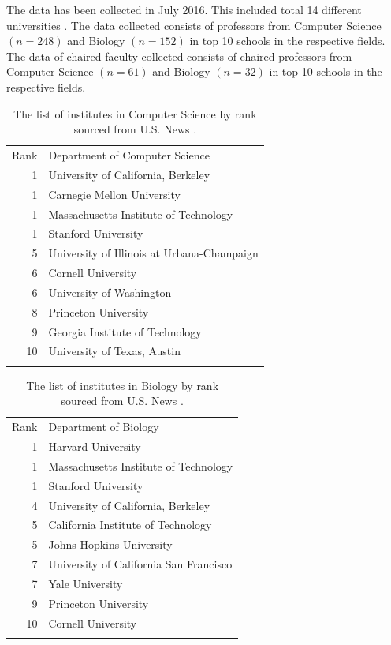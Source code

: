 The data has been collected in July 2016. This included total 14 different universities . The data collected consists of professors from Computer Science $( n = 248 )$ and Biology $( n = 152 )$ in top 10 schools in the respective fields. The data of chaired faculty collected consists of chaired professors from Computer Science $( n = 61 )$ and Biology $( n = 32 )$ in top 10 schools in the respective fields.


\begin{table}
\centering
\caption{The list of institutes in Computer Science by rank sourced from U.S. News \cite{usnews}.}
\label{tab:1}       %
\begin{tabular}{rl}
\hline\noalign{\smallskip}
Rank & Department of Computer Science \\
\noalign{\smallskip}\hline\noalign{\smallskip}
1 & University of California, Berkeley \\
1 & Carnegie Mellon University \\
1 & Massachusetts Institute of Technology \\
1 & Stanford University \\
5 & University of Illinois at Urbana-Champaign \\
6 & Cornell University \\
6 & University of Washington \\
8 & Princeton University \\
9 & Georgia Institute of Technology \\
10 & University of Texas, Austin  \\
\noalign{\smallskip}\hline
\end{tabular}
\end{table}



\begin{table}
\centering
\caption{The list of institutes in Biology by rank sourced from U.S. News \cite{usnews}.}
\label{tab:}       %
\begin{tabular}{rl}
\hline\noalign{\smallskip}
Rank & Department of Biology  \\
\noalign{\smallskip}\hline\noalign{\smallskip}
1 & Harvard University \\
1 & Massachusetts Institute of Technology \\
1 & Stanford University \\
4 & University of California, Berkeley \\
5 & California Institute of Technology \\
5 & Johns Hopkins University \\
7 & University of California San Francisco \\
7 & Yale University \\
9 & Princeton University \\
10 & Cornell University \\

\noalign{\smallskip}\hline
\end{tabular}
\end{table}


